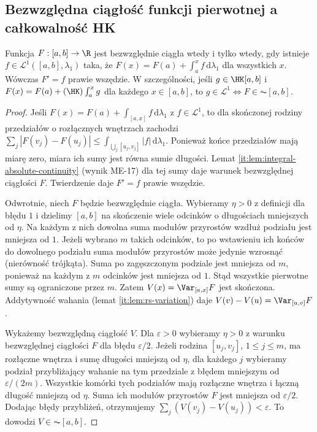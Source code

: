 \subsection{Bezwzględna ciągłość funkcji pierwotnej a całkowalność HK}
\begin{twierdzenie}\label{ma1:kh:thm:ac-lebesgue-primitive}\label{it:thm:ac-lebesgue-primitive}
Funkcja $F:[a,b]\to\R$ jest bezwzględnie ciągła wtedy i tylko wtedy, gdy istnieje $f\in\mathcal L^1([a,b],\lambda_1)$ taka, że $F(x)=F(a)+\int_a^x f\,\mathrm d\lambda_1$ dla wszystkich $x$. Wówczas $F'=f$ prawie wszędzie. W szczególności, jeśli $g\in\HK[a,b]$ i $F(x)=F(a)+(\HK)\int_a^x g$ dla każdego $x\in[a,b]$, to
$g\in\mathcal L^1\Longleftrightarrow F\in\AC[a,b]$.
\end{twierdzenie}
\begin{proof}
Jeśli $F(x)=F(a)+\int_{[a,x]} f\,\mathrm d\lambda_1$ z $f\in\mathcal L^1$, to dla skończonej rodziny przedziałów o rozłącznych wnętrzach zachodzi
$\sum_j|F(v_j)-F(u_j)|\le\int_{\bigcup_j[u_j,v_j]}|f|\,\mathrm d\lambda_1$. Ponieważ końce przedziałów mają miarę zero, miara ich sumy jest równa sumie długości. Lemat \ref{it:lem:integral-absolute-continuity} (wynik ME-17) dla tej sumy daje warunek bezwzględnej ciągłości $F$. Twierdzenie  daje $F'=f$ prawie wszędzie.

Odwrotnie, niech $F$ będzie bezwzględnie ciągła. Wybieramy $\eta>0$ z definicji dla błędu $1$ i dzielimy $[a,b]$ na skończenie wiele odcinków o długościach mniejszych od $\eta$. Na każdym z nich dowolna suma modułów przyrostów wzdłuż podziału jest mniejsza od $1$. Jeżeli wybrano $m$ takich odcinków, to po wstawieniu ich końców do dowolnego podziału suma modułów przyrostów może jedynie wzrosnąć (nierówność trójkąta). Suma po zagęszczonym podziale jest mniejsza od $m$, ponieważ na każdym z $m$ odcinków jest mniejsza od $1$. Stąd wszystkie pierwotne sumy są ograniczone przez $m$. Zatem $V(x)=\Var_{[a,x]}F$ jest skończona. Addytywność wahania (lemat \ref{it:lem:rs-variation}) daje $V(v)-V(u)=\Var_{[u,v]}F$.

Wykażemy bezwzględną ciągłość $V$. Dla $\varepsilon>0$ wybieramy $\eta>0$ z warunku bezwzględnej ciągłości $F$ dla błędu $\varepsilon/2$. Jeżeli rodzina $[u_j,v_j]$, $1\le j\le m$, ma rozłączne wnętrza i sumę długości mniejszą od $\eta$, dla każdego $j$ wybieramy podział przybliżający wahanie na tym przedziale z błędem mniejszym od $\varepsilon/(2m)$. Wszystkie komórki tych podziałów mają rozłączne wnętrza i łączną długość mniejszą od $\eta$. Suma ich modułów przyrostów $F$ jest mniejsza od $\varepsilon/2$. Dodając błędy przybliżeń, otrzymujemy $\sum_j(V(v_j)-V(u_j))<\varepsilon$. To dowodzi $V\in\AC[a,b]$.


\end{proof}
